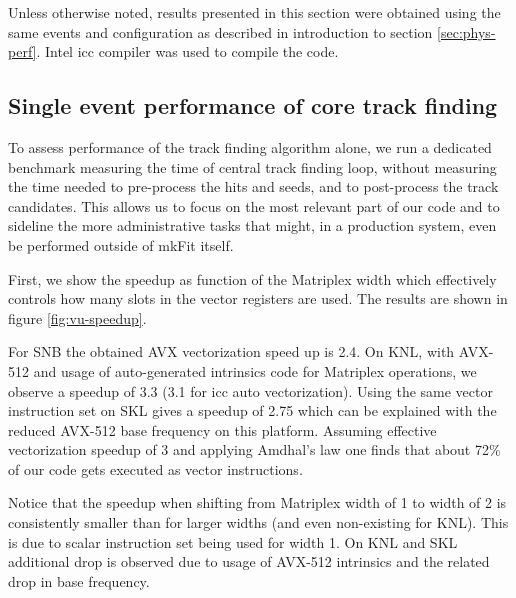 \documentclass{webofc}
\def\mkfit{mkFit\xspace}
\begin{document}
Unless otherwise noted, results presented in this section were obtained
using the same events and configuration as described in introduction to
section \ref{sec:phys-perf}. Intel icc compiler was used to compile the
code.


\subsection{Single event performance of core track finding}

To assess performance of the track finding algorithm alone, we run a dedicated
benchmark measuring the time of central track finding loop, without measuring
the time needed to pre-process the hits and seeds, and to post-process the
track candidates. This allows us to focus on the most relevant part of our
code and to sideline the more administrative tasks that might, in a production
system, even be performed outside of \mkfit itself.

First, we show the speedup as function of the Matriplex width which
effectively controls how many slots in the vector registers are used. The
results are shown in figure \ref{fig:vu-speedup}.

For SNB the obtained AVX vectorization speed up is 2.4. On KNL, with AVX-512
and usage of auto-generated intrinsics code for Matriplex operations, we
observe a speedup of 3.3 (3.1 for icc auto vectorization). Using the same
vector instruction set on SKL gives a speedup of 2.75 which can be explained
with the reduced AVX-512 base frequency on this platform. Assuming effective
vectorization speedup of 3 and applying Amdhal's law one finds that about 72\%
of our code gets executed as vector instructions.

Notice that the speedup when shifting from Matriplex width of 1 to width of 2
is consistently smaller than for larger widths (and even non-existing for
KNL). This is due to scalar instruction set being used for width 1. On KNL and
SKL additional drop is observed due to usage of AVX-512 intrinsics and the
related drop in base frequency.
\end{document}
